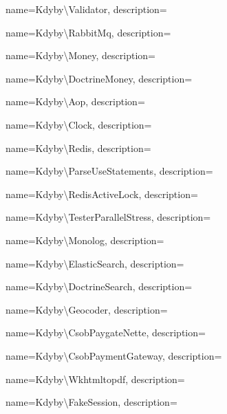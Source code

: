  {
  name={Kdy\-by\textbackslash{}Va\-li\-da\-tor},
  description={} }

 {
  name={Kdy\-by\textbackslash{}Ra\-bbit\-Mq},
  description={} }

 {
  name={Kdy\-by\textbackslash{}Mo\-ney},
  description={} }

 {
  name={Kdy\-by\textbackslash{}Doc\-tri\-ne\-Mo\-ney},
  description={} }

 {
  name={Kdy\-by\textbackslash{}Aop},
  description={} }

 {
  name={Kdy\-by\textbackslash{}Clo\-ck},
  description={} }

 {
  name={Kdy\-by\textbackslash{}Re\-di\-s},
  description={} }

 {
  name={Kdy\-by\textbackslash{}Par\-se\-Use\-Sta\-te\-men\-ts},
  description={} }

 {
  name={Kdy\-by\textbackslash{}Re\-dis\-Acti\-ve\-Lock},
  description={} }

 {
  name={Kdy\-by\textbackslash{}Tes\-ter\-Pa\-ra\-llel\-St\-ress},
  description={} }

 {
  name={Kdy\-by\textbackslash{}Mo\-no\-log},
  description={} }

 {
  name={Kdy\-by\textbackslash{}Elastic\-Sear\-ch},
  description={} }

 {
  name={Kdy\-by\textbackslash{}Doc\-tri\-ne\-Sear\-ch},
  description={} }

 {
  name={Kdy\-by\textbackslash{}Geo\-co\-der},
  description={} }

 {
  name={Kdy\-by\textbackslash{}Csob\-Pay\-gate\-Nette},
  description={} }

 {
  name={Kdy\-by\textbackslash{}Csob\-Pay\-me\-nt\-Ga\-te\-way},
  description={} }

 {
  name={Kdy\-by\textbackslash{}Wk\-html\-to\-pdf},
  description={} }

 {
  name={Kdy\-by\textbackslash{}Fa\-ke\-Ses\-si\-on},
  description={} }

